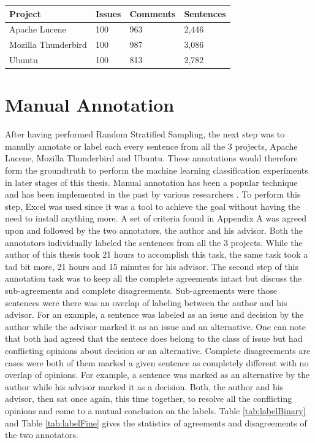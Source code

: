 \documentclass[a4paper,12pt,twoside]{report}
\begin{document}
\begin{table} %
    \centering
    \begin{adjustbox}{max width=\columnwidth}
    \def\arraystretch{1} %
    \begin{tabular}{p{4cm} p{1cm} p{2cm} p{3cm}}
        \toprule
        \textbf{Project} & \textbf{Issues} & \textbf{Comments} & \textbf{Sentences}\\
        \midrule
			Apache Lucene & 100 & 963 & 2,446\\
			Mozilla Thunderbird & 100 & 987 & 3,086\\ 
			Ubuntu & 100 & 813 & 2,782\\
        \midrule
    \end{tabular}
    \end{adjustbox}
    \label{tab:overviewRSS}
\end{table}

\section{Manual Annotation}
After having performed Random Stratified Sampling, the next step was to manully annotate or label each every sentence from all the 3 projects, Apache Lucene, Mozilla Thunderbird and Ubuntu. These annotations would therefore form the groundtruth to perform the machine learning classification experiments in later stages of this thesis. Manual annotation has been a popular technique and has been implemented in the past by various researchers \cite{Alkadhi2017} \cite{Nonnenmacher2017}. 
\bigbreak
To perform this step, Excel was used since it was a tool to achieve the goal without having the need to install anything more. A set of criteria found in Appendix A was agreed upon and followed by the two annotators, the author and his advisor. Both the annotators individually labeled the sentences from all the 3 projects. While the author of this thesis took 21 hours to accomplish this task, the same task took a tad bit more, 21 hours and 15 minutes for his advisor. 
\bigbreak
The second step of this annotation task was to keep all the complete agreements intact but discuss the sub-agreements and complete disagreements. Sub-agreements were those sentences were there was an overlap of labeling between the author and his advisor. For an example, a sentence was labeled as an issue and decision by the author while the advisor marked it as an issue and an alternative. One can note that both had agreed that the sentece does belong to the class of issue but had conflicting opinions about decision or an alternative. Complete disagreements are cases were both of them marked a given sentence as completely different with no overlap of opinions. For example, a sentence was marked as an alternative by the author while his advisor marked it as a decision. Both, the author and his advisor, then sat once again, this time together, to resolve all the conflicting opinions and come to a mutual conclusion on the labels. Table \ref{tab:labelBinary} and Table \ref{tab:labelFine} gives the statistics of agreements and disagreements of the two annotators. 
\end{document}
